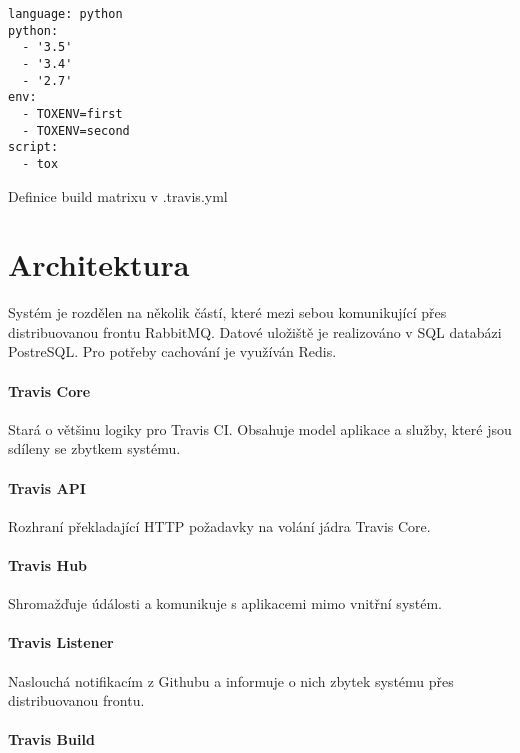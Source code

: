 \begin{listing}[ht]
\begin{verbatim}
language: python
python:
  - '3.5'
  - '3.4'
  - '2.7'
env:
  - TOXENV=first
  - TOXENV=second
script:
  - tox
\end{verbatim}
\label{code:travis-matrix}
\caption{Definice build matrixu v .travis.yml}
\end{listing}

\section{Architektura}

Systém je rozdělen na několik částí, které mezi sebou komunikující přes distribuovanou frontu RabbitMQ.
Datové uložiště je realizováno v SQL databázi PostreSQL.
Pro potřeby cachování je využíván Redis.


\paragraph{Travis Core}

Stará o většinu logiky pro Travis CI.
Obsahuje model aplikace a služby, které jsou sdíleny se zbytkem systému.

\paragraph{Travis API}

Rozhraní překladající HTTP požadavky na volání jádra Travis Core.

\paragraph{Travis Hub}

Shromažďuje údálosti a komunikuje s aplikacemi mimo vnitřní systém.

\paragraph{Travis Listener}

Naslouchá notifikacím z Githubu a informuje o nich zbytek systému přes distribuovanou frontu.

\paragraph{Travis Build}


